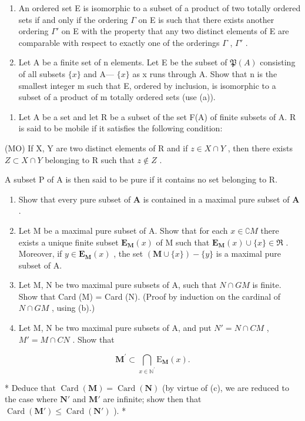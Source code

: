 \begin{enumerate}
\def\labelenumi{(\alph{enumi})}
\setcounter{enumi}{1}
\item
  An ordered set E is isomorphic to a subset of a product of two totally ordered sets if and only if the ordering \(\Gamma\) on E is such that there exists another ordering \(\Gamma'\) on E with the property that any two distinct elements of E are comparable with respect to exactly one of the orderings \(\Gamma\) , \(\Gamma'\) .
\item
  Let A be a finite set of n elements. Let E be the subset of \(\mathfrak{P}(A)\) consisting of all subsets \(\{x\}\) and A--- \(\{x\}\) as x runs through A. Show that n is the smallest integer m such that E, ordered by inclusion, is isomorphic to a subset of a product of m totally ordered sets (use (a)).
\end{enumerate}

\begin{enumerate}
\def\labelenumi{\arabic{enumi}.}
\setcounter{enumi}{10}
\tightlist
\item
  Let A be a set and let R be a subset of the set F(A) of finite subsets of A. R is said to be mobile if it satisfies the following condition:
\end{enumerate}

(MO) If X, Y are two distinct elements of R and if \(z \in X \cap Y\) , then there exists \(Z \subset X \cap Y\) belonging to R such that \(z \notin Z\) .

A subset P of A is then said to be pure if it contains no set belonging to R.

\begin{enumerate}
\def\labelenumi{(\alph{enumi})}
\item
  Show that every pure subset of \(\mathbf{A}\) is contained in a maximal pure subset of \(\mathbf{A}\) .
\item
  Let M be a maximal pure subset of A. Show that for each \(x \in \complement M\) there exists a unique finite subset \(\mathbf{E}_{\mathbf{M}}(x)\) of M such that \(\mathbf{E}_{\mathbf{M}}(x) \cup \{x\} \in \Re\) . Moreover, if \(y \in \mathbf{E}_{\mathbf{M}}(x)\) , the set \((\mathbf{M} \cup \{x\}) - \{y\}\) is a maximal pure subset of A.
\item
  Let M, N be two maximal pure subsets of A, such that \(N \cap GM\) is finite. Show that Card (M) = Card (N). (Proof by induction on the cardinal of \(N \cap GM\) , using (b).)
\item
  Let M, N be two maximal pure subsets of A, and put \(N' = N \cap CM\) , \(M' = M \cap CN\) . Show that
\end{enumerate}

\[
\mathbf {M} ^ {\prime} \subset \bigcap_ {x \in \mathbb {N} ^ {\prime}} \mathrm{E} _ {\mathbf {M}} (x).
\]

* Deduce that \(\operatorname{Card}(\mathbf{M}) = \operatorname{Card}(\mathbf{N})\) (by virtue of (c), we are reduced to the case where \(\mathbf{N}'\) and \(\mathbf{M}'\) are infinite; show then that \(\operatorname{Card}(\mathbf{M}') \leqslant \operatorname{Card}(\mathbf{N}')\) ). *

